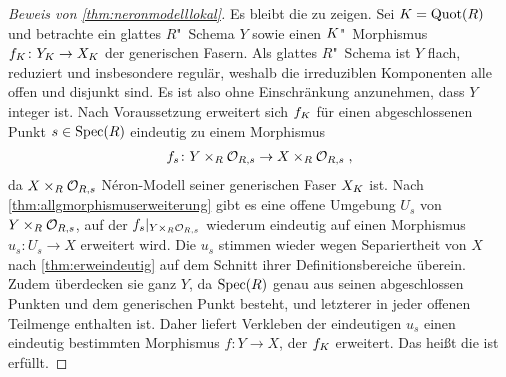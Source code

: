 \begin{proof}[Beweis von \ref{thm:neronmodelllokal}]
  Es bleibt die \NAbbEig zu zeigen.
  Sei ${K=\operatorname{Quot}(R)}$ und betrachte ein glattes $R$"~Schema $Y$ sowie
  einen $K$"~Morphismus ${f_{K}\colon Y_{K}\to X_{K}}$ der
  generischen Fasern.
  Als glattes $R$"~Schema ist $Y$ flach, reduziert und insbesondere
  regulär, weshalb die irreduziblen Komponenten alle offen und
  disjunkt sind. Es ist also ohne Einschränkung anzunehmen, dass
  $Y$ integer ist.
  Nach Voraussetzung erweitert sich $f_{K}$ für einen abgeschlossenen
  Punkt $s\in\operatorname{Spec}(R)$ eindeutig zu einem Morphismus
  \begin{gather*}
    f_s\colon Y\times_R\mathcal{O}_{R,s}\to X\times_R\mathcal{O}_{R,s}\;,
  \end{gather*}
  da $X\times_R\mathcal{O}_{R,s}$ Néron-Modell seiner generischen Faser $X_{K}$
  ist.
  Nach \ref{thm:allgmorphismuserweiterung} gibt es eine offene
  Umgebung $U_s$ von $Y\times_R\mathcal{O}_{R,s}$, auf der
  $f_s|_{Y\times_R\mathcal{O}_{R,s}}$ wiederum
  eindeutig auf einen Morphismus $u_s\colon U_s\to X$ erweitert
  wird.
  Die $u_s$ stimmen wieder wegen Separiertheit von $X$
  nach \ref{thm:erweindeutig} auf dem Schnitt ihrer
  Definitionsbereiche überein. Zudem überdecken sie ganz $Y$,
  da $\operatorname{Spec}(R)$ genau aus seinen abgeschlossen Punkten und dem
  generischen Punkt besteht, und letzterer in jeder offenen Teilmenge
  enthalten ist. 
  Daher liefert Verkleben der eindeutigen $u_s$ einen
  eindeutig bestimmten Morphismus $f\colon Y\to X$, der
  $f_{K}$ erweitert.
  Das heißt die \NAbbEig ist erfüllt.
\end{proof}


